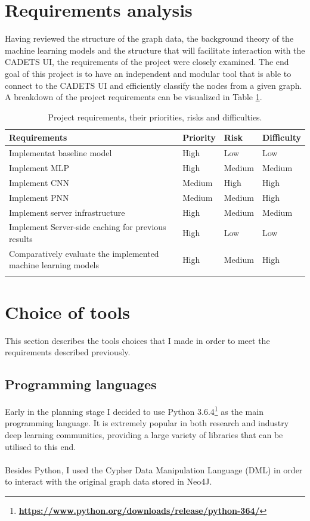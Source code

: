 	\section{Requirements analysis} \label{Section 2.4}
	Having reviewed the structure of the graph data, the background theory of the machine learning models and the structure that will facilitate interaction with the CADETS UI, the requirements of the project were closely examined. The end goal of this project is to have an independent and modular tool that is able to connect to the CADETS UI and efficiently classify the nodes from a given graph. A breakdown of the project requirements can be visualized in Table \ref{Table 2.2}.
	\begin{longtable}{|p{}|p{} p{} p{}|}
		\textbf{Requirements} & \textbf{Priority} & \textbf{Risk} & \textbf{Difficulty} \\
		\hline
		Implementat baseline model & High & Low & Low \\
		Implement MLP & High & Medium & Medium \\
		Implement CNN & Medium & High & High \\
		Implement PNN & Medium & Medium & High \\
		Implement server infrastructure & High & Medium & Medium \\
		Implement Server-side caching for previous results & High & Low & Low \\
		Comparatively evaluate the implemented machine learning models & High & Medium & High \\
		\hline
		\caption[Requirements overview]{\centering Project requirements, their priorities, risks and difficulties.}
		\label{Table 2.2}
	\end{longtable}
	\section{Choice of tools} \label{Section 2.5}
	This section describes the tools choices that I made in order to meet the requirements described previously. 
	\subsection{Programming languages} \label{Section 2.5.1}
	Early in the planning stage I decided to use Python 3.6.4\footnote{\textbf{\url{https://www.python.org/downloads/release/python-364/}}} as the main programming language. It is extremely popular in both research and industry deep learning communities, providing a large variety of libraries that can be utilised to this end. 
	\\ \\
	Besides Python, I used the Cypher Data Manipulation Language (DML) in order to interact with the original graph data stored in Neo4J.  
	

